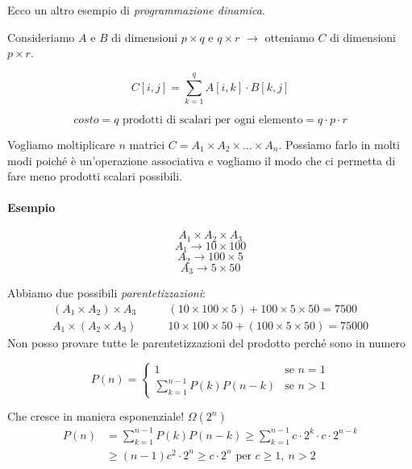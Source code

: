 Ecco un altro esempio di \emph{programmazione dinamica}.

Consideriamo $A$ e $B$ di dimensioni $p \times q$ e $q \times r$
$\rightarrow$ otteniamo $C$ di dimensioni $p \times r$.

$$C[i,j] = \displaystyle\sum_{k=1}^q A[i,k] \cdot B[k,j]$$

$$costo = q \text{ prodotti di scalari per ogni elemento} = q\cdot p \cdot r$$

Vogliamo moltiplicare $n$ matrici $C = A_1 \times A_2 \times \ldots \times A_n$. 
Possiamo farlo in molti modi poich\'e è un'operazione associativa e vogliamo il modo che ci permetta di fare meno prodotti scalari possibili.

\paragraph{Esempio} 
$$A_1 \times A_2 \times A_3$$ 
$$A_1 \rightarrow 10 \times 100$$
$$A_2 \rightarrow 100 \times 5$$
$$A_3 \rightarrow 5 \times 50$$

Abbiamo due possibili \emph{parentetizzazioni}:
\begin{align*}
    (A_1 \times A_2) \times A_3 \qquad & (10 \times 100 \times 5) + 100 \times 5 \times 50 = 7500 \\
    A_1 \times (A_2 \times A_3) \qquad & 10 \times 100 \times 50 + (100 \times 5 \times 50) = 75000
\end{align*}
Non posso provare tutte le parentetizzazioni del prodotto perch\'e sono in numero

\[
    P(n) = 
    \begin{cases}
        1 & \text{se } n = 1 \\
        \displaystyle\sum_{k=1}^{n-1} P(k) P(n-k) & \text{se } n > 1
    \end{cases}
\]

Che cresce in maniera esponenziale! $\Omega(2^n)$
\begin{align*}
    P(n) & = \displaystyle\sum_{k=1}^{n-1} P(k) P(n-k) 
        \geq \displaystyle\sum_{k=1}^{n-1} c \cdot 2^k \cdot c \cdot 2^{n-k} \\
        & \geq (n-1)c^2 \cdot 2^n \geq c \cdot 2^n \text{ per } c \geq 1, \ n > 2
\end{align*}

